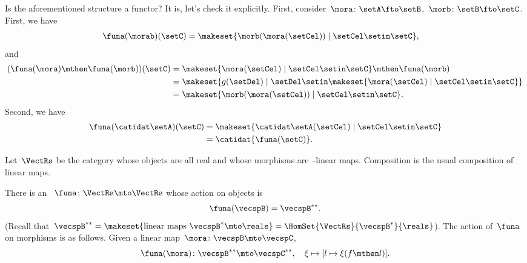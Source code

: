 \begin{example}
    Is the aforementioned structure a functor?
    It is, let's check it explicitly.
    First, consider~$\mora\colon \setA\fto \setB$,~$\morb\colon \setB \fto \setC$.
    First, we have
    \begin{equation}
        \begin{aligned}
            \funa(\morab)(\setC) & =\makeset{ \morb(\mora(\setCel))\mid \setCel \setin \setC},
        \end{aligned}
    \end{equation}
    and
    \begin{equation}
        \begin{aligned}
            (\funa(\mora)\mthen \funa(\morb))(\setC)
             & =\makeset{ \mora(\setCel) \mid \setCel \setin \setC}\mthen \funa(\morb) \\
             & =\makeset{g(\setDel)\mid \setDel \setin \makeset{\mora(\setCel)\mid \setCel\setin \setC}} \\
             & =\makeset{ \morb(\mora(\setCel))\mid \setCel \setin \setC}.
        \end{aligned}
    \end{equation}
    Second, we have
    \begin{equation}
        \begin{aligned}
            \funa(\catidat\setA)(\setC) & = \makeset{\catidat\setA(\setCel)\mid \setCel \setin \setC} \\
                                        & =\catidat{\funa(\setC)}.
        \end{aligned}
    \end{equation}
\end{example}


\begin{example}
    \label{exa:double-dual-functor}
    Let~$\VectRs$ be the category whose objects are all real  and whose morphisms are~\reals-linear maps.
    Composition is the usual composition of linear maps.

    There is an ~$\funa \colon \VectRs \mto \VectRs$ whose action on objects is
    \begin{equation}
        \funa ( \vecspB ) = \vecspB^{**}.
    \end{equation}
    (Recall that~$\vecspB^{**} = \makeset{ \text{linear maps } \vecspB^* \mto \reals } =  \HomSet{\VectRs}{\vecspB^*}{\reals}$).
    The action of~$\funa$ on morphisms is as follows.
    Given a linear map~$\mora \colon \vecspB \mto \vecspC$,
    \begin{equation}
        \funa ( \mora ) \colon \vecspB^{**} \mto \vecspC^{**}, \quad \xi \mapsto [ l \mapsto \xi (f \mthen l)].
    \end{equation}
\end{example}

